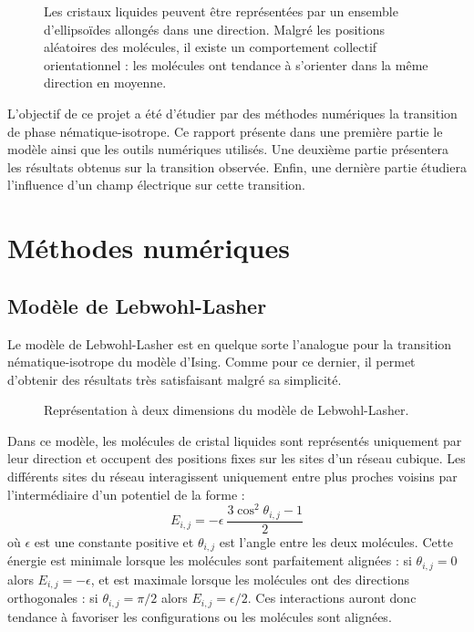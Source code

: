 \documentclass[11pt,a4paper]{article}
\numberwithin{equation}{section}
\begin{document}
\begin{figure}[h]
    \center
    
    \caption{Les cristaux liquides peuvent être représentées par un ensemble d'ellipsoïdes allongés dans une direction.
    Malgré les positions aléatoires des molécules, il existe un comportement collectif orientationnel : les molécules ont tendance à s'orienter dans la même direction en moyenne. }
    \label{nematic_phase}
\end{figure}

L'objectif de ce projet a été d'étudier par des méthodes numériques la transition de phase nématique-isotrope.
Ce rapport présente dans une première partie le modèle ainsi que les outils numériques utilisés. 
Une deuxième partie présentera les résultats obtenus sur la transition observée.
Enfin, une dernière partie étudiera l'influence d'un champ électrique sur cette transition.

\newpage
\section{Méthodes numériques}

\subsection{Modèle de Lebwohl-Lasher}
Le modèle de Lebwohl-Lasher \cite{model} est en quelque sorte l'analogue pour la transition nématique-isotrope du modèle d'Ising. Comme pour ce dernier, il permet d'obtenir des résultats très satisfaisant malgré sa simplicité.\medskip

\begin{figure}[h]
    \center
    
    \caption{Représentation à deux dimensions du modèle de Lebwohl-Lasher.}
    \label{lebwohl}
\end{figure}


Dans ce modèle, les molécules de cristal liquides sont représentés uniquement par leur direction et occupent des positions fixes sur les sites d'un réseau cubique.
Les différents sites du réseau interagissent uniquement entre plus proches voisins par l'intermédiaire d'un potentiel de la forme :
\begin{equation}
E_{i,j} = - \epsilon\ \frac{3\cos^2\theta_{i,j}-1}{2}
\end{equation}
où $\epsilon$ est une constante positive et $\theta_{i,j}$ est l'angle entre les deux molécules. 
Cette énergie est minimale lorsque les molécules sont parfaitement alignées : si $\theta_{i,j} = 0$ alors $E_{i,j} = - \epsilon$, et est maximale lorsque les molécules ont des directions orthogonales : si $\theta_{i,j} = \pi/2$ alors $E_{i,j} = \epsilon/2$.
Ces interactions auront donc tendance à favoriser les configurations ou les molécules sont alignées.\medskip
\end{document}
